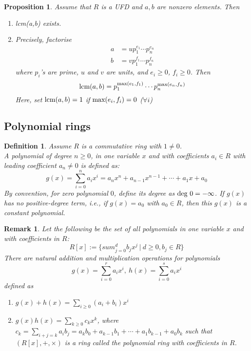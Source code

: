 \documentclass[a4paper,8pt]{article}
\newcommand{\hlt}[1]{\textit{{\color{blue}#1}}}
\newcommand{\maxs}[1]{\textnormal{max}#1}
\newcommand{\lcms}[1]{\textnormal{lcm}#1}
\newcommand{\degs}[1]{\textnormal{deg}#1}
\theoremstyle{theorem}
\newtheorem{proposition}[theorem]{Proposition}
\newtheorem{definition}[theorem]{Definition}
\newtheorem{remark}[theorem]{Remark}
\begin{document}
\begin{proposition}
Assume that $R$ is a UFD and $a,b$ are nonzero elements. Then
\begin{enumerate}[label=(\roman*)]
\item \lcms(a,b) exists.
\item Precisely, factorise
\begin{align}
a &= u p_1^{e_1} \cdots p_n^{e_n} \nonumber \\
b &= v p_1^{f_1} \cdots p_n^{f_n} \nonumber
\end{align}
where $p_i$'s are prime, $u$ and $v$ are units, and $e_i \geq 0$, $f_i \geq 0$. Then
\begin{equation}
\lcms(a,b) = p_1^{\maxs(e_1, f_1)} \cdots p_n^{\maxs(e_n, f_n)} \nonumber
\end{equation}
Here, set $\lcms(a,b) = 1$ if $\maxs(e_i, f_i) = 0$ ($\forall i$)
\end{enumerate}
\end{proposition}

\subsection{Polynomial rings}

\begin{definition}
Assume $R$ is a commutative ring with $1 \neq 0$. \\
A \hlt{polynomial of degree $n \geq 0$, in one variable $x$ and with coefficients $a_i \in R$ with leading coefficient $a_n \neq 0$} is defined as:
\begin{equation}
g(x) = \sum_{i=0}^{n} a_i x^i = a_n x^n + a_{n-1} x^{n-1} + \cdots + a_1 x + a_0 \nonumber
\end{equation}
By convention, for zero polynomial $0$, define its degree as $\degs \ 0 = - \infty$.
If $g(x)$ has no positive-degree term, i.e., if $g(x) = a_0$ with $a_0 \in R$, then this $g(x)$ is a \hlt{constant polynomial}.
\end{definition}

\begin{remark}
Let the following be the set of all polynomials in one variable $x$ and with coefficients in $R$:
\begin{equation}
R[x] := \{sum_{j=0}^{d} b_j x^j \ | \ d \geq 0, b_j \in R\} \nonumber
\end{equation}
There are natural addition and multiplication operations for polynomials
\begin{equation}
g(x) = \sum_{i=0}^{r} a_i x^i, \ h(x) = \sum_{i=0}^{s} a_i x^i \nonumber
\end{equation}
defined as
\begin{enumerate}[label=(\roman*)]
\item $g(x) + h(x) = \sum_{i \geq 0} (a_i + b_i)x^i$
\item $g(x)h(x) = \sum_{k \geq 0} c_k x^k$, where $c_k = \sum_{i+j = k} a_i b_j = a_k b_0 + a_{k-1} b_1 + \cdots + a_1 b_{k-1} + a_0 b_k$ such that $(R[x], +, \times)$ is a ring called the \hlt{polynomial ring with coefficients in $R$}.
\end{enumerate}
\end{remark}
\end{document}
